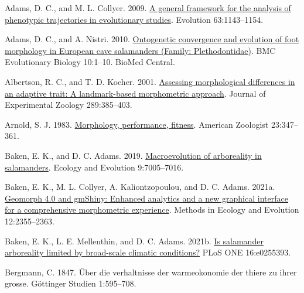 \documentclass[
  11pt,
]{article}
\newlength{\cslhangindent}
\newlength{\cslentryspacingunit} %
\newenvironment{CSLReferences}[2] %
 {%
  \setlength{\parindent}{0pt}
  \ifodd #1
  \let\oldpar\par
  \def\par{\hangindent=\cslhangindent\oldpar}
  \fi
  \setlength{\parskip}{#2\cslentryspacingunit}
 }%
 {}
\begin{document}
\setlength{\parindent}{-0.25in} \setlength{\leftskip}{0.25in}
\setlength{\parskip}{8pt} \noindent

\hypertarget{refs}{}
\begin{CSLReferences}{1}{0}
\leavevmode{}%
Adams, D. C., and M. L. Collyer. 2009.
\href{https://doi.org/10.1111/j.1558-5646.2009.00649.x}{A general
framework for the analysis of phenotypic trajectories in evolutionary
studies}. Evolution 63:1143--1154.

\leavevmode{}%
Adams, D. C., and A. Nistri. 2010.
\href{https://doi.org/10.1186/1471-2148-10-216}{Ontogenetic convergence
and evolution of foot morphology in {E}uropean cave salamanders
({F}amily: {P}lethodontidae)}. BMC Evolutionary Biology 10:1--10. BioMed
Central.

\leavevmode{}%
Albertson, R. C., and T. D. Kocher. 2001.
\href{https://doi.org/10.1002/jez.1020}{Assessing morphological
differences in an adaptive trait: A landmark-based morphometric
approach}. Journal of Experimental Zoology 289:385--403.

\leavevmode{}%
Arnold, S. J. 1983.
\href{https://doi.org/10.1093/icb/23.2.347}{Morphology, performance,
fitness}. American Zoologist 23:347--361.

\leavevmode{}%
Baken, E. K., and D. C. Adams. 2019.
\href{https://doi.org/10.1002/ece3.5267}{Macroevolution of arboreality
in salamanders}. Ecology and Evolution 9:7005--7016.

\leavevmode{}%
Baken, E. K., M. L. Collyer, A. Kaliontzopoulou, and D. C. Adams. 2021a.
\href{https://doi.org/10.1111/2041-210X.13723}{Geomorph 4.0 and gmShiny:
Enhanced analytics and a new graphical interface for a comprehensive
morphometric experience}. Methods in Ecology and Evolution
12:2355--2363.

\leavevmode{}%
Baken, E. K., L. E. Mellenthin, and D. C. Adams. 2021b.
\href{https://doi.org/10.1371/journal.pone.0255393}{Is salamander
arboreality limited by broad-scale climatic conditions?} PLoS ONE
16:e0255393.

\leavevmode{}%
Bergmann, C. 1847. {Ü}ber die verhaltnisse der warmeokonomie der thiere
zu ihrer grosse. G{ö}ttinger Studien 1:595--708.


\end{CSLReferences}
\end{document}
